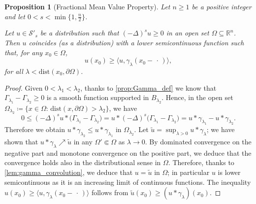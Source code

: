 \documentclass[10pt, reqno]{amsart}
\newcounter{results}[section] %
\theoremstyle{plain}
\newtheorem{proposition}[results]{Proposition}
\theoremstyle{remark}
\theoremstyle{definition}
\numberwithin{equation}{section}
\theoremstyle{plain}
\newcommand{\R}{\ensuremath{\mathbb R}} %
\newcommand{\scalprod}[1]{\ensuremath{\langle #1\rangle}} %
\newcommand{\emptyparam}{\ensuremath{\,\cdot\,}}%
\newcommand{\defeq}{\ensuremath{\coloneqq}}%
\newcommand{\lapl}{\ensuremath{\Delta}}
\begin{document}
\begin{proposition}[Fractional Mean Value Property] \label{prop:fractional_mean_value_property}
    Let $n\ge 1$ be a positive integer and let $0<s < \min\{1, \tfrac n2\}$.
    
    Let $u\in\mathcal S'_s$ be a distribution such that $(-\lapl)^s u\ge 0$ in an open set $\Omega\subseteq\R^n$.
    Then $u$ coincides (as a distribution) with a lower semicontinuous function such that, for any $x_0\in\Omega$,
    \begin{equation*}
        u(x_0) \ge \scalprod{u, \gamma_\lambda(x_0-\emptyparam)},
    \end{equation*}
    for all $\lambda < \mathrm{dist}(x_0, \partial\Omega)$. 
\end{proposition}
\begin{proof}
    Given $0<\lambda_1<\lambda_2$, thanks to \cref{prop:Gamma_def} we know that $\Gamma_{\lambda_1}- \Gamma_{\lambda_2}\ge 0$ is a smooth function supported in $B_{\lambda_2}$. Hence, in the open set $\Omega_{\lambda_2}\defeq\{x\in\Omega:\, \mathrm{dist}(x, \partial\Omega)>\lambda_2\}$, we have
    \begin{equation*}
        0 \le (-\lapl)^su \ast \big(\Gamma_{\lambda_1}-\Gamma_{\lambda_2}\big)
        =
        u \ast (-\lapl)^s\big(\Gamma_{\lambda_1}-\Gamma_{\lambda_2}\big)
        =
        u\ast \gamma_{\lambda_1} - u\ast\gamma_{\lambda_2}.
    \end{equation*}
    Therefore we obtain $u\ast\gamma_{\lambda_2} \le u\ast\gamma_{\lambda_1}$ in $\Omega_{\lambda_2}$. Let $\tilde u = \sup_{\lambda>0} u\ast\gamma_\lambda$; we have shown that $u\ast\gamma_\lambda\nearrow \tilde u$ in any $\Omega'\Subset\Omega$ as $\lambda\to 0$. By dominated convergence on the negative part and monotone convergence on the positive part, we deduce that the convergence holds also in the distributional sense in $\Omega$. 
    Therefore, thanks to \cref{lem:gamma_convolution}, we deduce that $u=\tilde u$ in $\Omega$; in particular $u$ is lower semicontinuous as it is an increasing limit of continuous functions.
    The inequality $u(x_0)\ge \scalprod{u, \gamma_\lambda(x_0-\emptyparam)}$ follows from $\tilde u(x_0) \ge (u\ast \gamma_\lambda)(x_0)$.
\end{proof}
\end{document}
